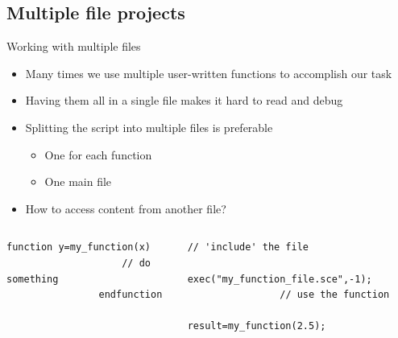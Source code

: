 \subsection{Multiple file projects}
\begin{frame}[fragile]{Working with multiple files}
    \begin{itemize}
        \setitemsep{1em}
        \item Many times we use multiple user-written functions to accomplish our task
        \item<2-> Having them all in a single file makes it hard to read and debug
        \item<3-> Splitting the script into multiple files is preferable
        \begin{itemize}
            \item One for each function
            \item One main file
        \end{itemize}
        \item<4-> How to access content from another file?
    \end{itemize}
    \begin{columns}
        \begin{column}{0.5\linewidth}
            \begin{lstlisting}[title={\small \inlinecode{my\_function\_file.sce}}]
                function y=my_function(x)
                    // do something
                endfunction
            \end{lstlisting}
        \end{column}
        \begin{column}{0.5\linewidth}
            \begin{lstlisting}[title={\small \inlinecode{main.sce}}]
                // 'include' the file
                exec("my_function_file.sce",-1);
                // use the function
                result=my_function(2.5);
            \end{lstlisting}
        \end{column}
    \end{columns}
\end{frame}

